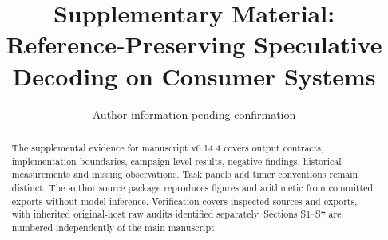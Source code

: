 \documentclass[final,5p,times,twocolumn]{elsarticle}
\begin{document}
\begin{frontmatter}
\title{Supplementary Material: Reference-Preserving Speculative Decoding on Consumer Systems}
\author{Author information pending confirmation}
\begin{abstract}
The supplemental evidence for manuscript v0.14.4 covers output contracts, implementation boundaries, campaign-level results, negative findings, historical measurements and missing observations. Task panels and timer conventions remain distinct. The author source package reproduces figures and arithmetic from committed exports without model inference. Verification covers inspected sources and exports, with inherited original-host raw audits identified separately. Sections S1--S7 are numbered independently of the main manuscript.
\end{abstract}
\end{frontmatter}
\renewcommand{\thesection}{S\arabic{section}}
\renewcommand{\thetable}{S\arabic{table}}
\renewcommand{\thefigure}{S\arabic{figure}}
\renewcommand{\theequation}{S\arabic{equation}}
\setcounter{tocdepth}{2}
\tableofcontents








\FloatBarrier
\begingroup\small

\endgroup
\end{document}
